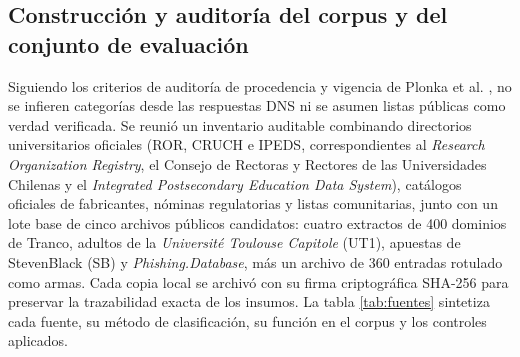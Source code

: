 \documentclass[10pt,a4paper]{article}
\begin{document}
\subsection{Construcción y auditoría del corpus y del conjunto de evaluación}\label{subsec:metodo-corpus}

Siguiendo los criterios de auditoría de procedencia y vigencia de Plonka et al. \cite{plonka2025}, no se infieren categorías desde las respuestas DNS ni se asumen listas públicas como verdad verificada. Se reunió un inventario auditable combinando directorios universitarios oficiales (ROR, CRUCH e IPEDS, correspondientes al \emph{Research Organization Registry}, el Consejo de Rectoras y Rectores de las Universidades Chilenas y el \emph{Integrated Postsecondary Education Data System}), catálogos oficiales de fabricantes, nóminas regulatorias y listas comunitarias, junto con un lote base de cinco archivos públicos candidatos: cuatro extractos de 400 dominios de Tranco, adultos de la \emph{Université Toulouse Capitole} (UT1), apuestas de StevenBlack (SB) y \emph{Phishing.Database}, más un archivo de 360 entradas rotulado como armas. Cada copia local se archivó con su firma criptográfica SHA-256 para preservar la trazabilidad exacta de los insumos. La tabla \ref{tab:fuentes} sintetiza cada fuente, su método de clasificación, su función en el corpus y los controles aplicados.
\end{document}

